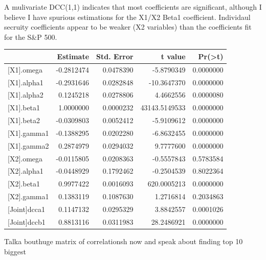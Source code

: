 \documentclass[]{elsarticle} %
\begin{document}
A mulivariate DCC(1,1) indicates that most coefficients are significant,
although I believe I have spurious estimations for the X1/X2 Beta1
coefficient. Individaul secruity coefficients appear to be weaker (X2
variables) than the coefficients fit for the S\&P 500.

\begin{longtable}[c]{@{}lrrrr@{}}
\toprule
& Estimate & Std. Error & t value &
Pr(\textgreater{}\textbar{}t\textbar{})\tabularnewline
\midrule
\endhead
{[}X1{]}.omega & -0.2812474 & 0.0478390 & -5.8790349 &
0.0000000\tabularnewline
{[}X1{]}.alpha1 & -0.2931646 & 0.0282848 & -10.3647370 &
0.0000000\tabularnewline
{[}X1{]}.alpha2 & 0.1245218 & 0.0278806 & 4.4662556 &
0.0000080\tabularnewline
{[}X1{]}.beta1 & 1.0000000 & 0.0000232 & 43143.5149533 &
0.0000000\tabularnewline
{[}X1{]}.beta2 & -0.0309803 & 0.0052412 & -5.9109612 &
0.0000000\tabularnewline
{[}X1{]}.gamma1 & -0.1388295 & 0.0202280 & -6.8632455 &
0.0000000\tabularnewline
{[}X1{]}.gamma2 & 0.2874979 & 0.0294032 & 9.7777600 &
0.0000000\tabularnewline
{[}X2{]}.omega & -0.0115805 & 0.0208363 & -0.5557843 &
0.5783584\tabularnewline
{[}X2{]}.alpha1 & -0.0448929 & 0.1792462 & -0.2504539 &
0.8022364\tabularnewline
{[}X2{]}.beta1 & 0.9977422 & 0.0016093 & 620.0005213 &
0.0000000\tabularnewline
{[}X2{]}.gamma1 & 0.1383119 & 0.1087630 & 1.2716814 &
0.2034863\tabularnewline
{[}Joint{]}dcca1 & 0.1147132 & 0.0295329 & 3.8842557 &
0.0001026\tabularnewline
{[}Joint{]}dccb1 & 0.8813116 & 0.0311983 & 28.2486921 &
0.0000000\tabularnewline
\bottomrule
\end{longtable}

Talka bouthuge matrix of correlationsh now and speak about finding top
10 biggest
\end{document}
